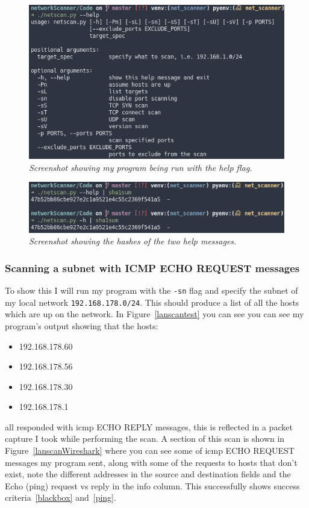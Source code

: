 \documentclass[titlepage]{article}
\let\Oldsubsubsection\subsubsection{}
\renewcommand{\subsubsection}{\FloatBarrier\Oldsubsubsection}
\begin{document}
\begin{figure}[H]
  \centering
  \includegraphics[width=\textwidth]{helpmessage.png}
  \caption{\textit{%
    Screenshot showing my program being run with the help flag.
}}\label{helpflagtest}
\end{figure}

\begin{figure}[H]
  \centering
  \includegraphics[width=\textwidth]{messagehashes.png}
  \caption{\textit{%
    Screenshot showing the hashes of the two help messages.
}}\label{messagehash}
\end{figure}

\subsubsection{Scanning a subnet with ICMP ECHO REQUEST messages}
To show this I will run my program with the \verb|-sn| flag and specify the
subnet of my local network \verb|192.168.178.0/24|.
This should produce a list of all the hosts which are up on the network.
In Figure~\ref{lanscantest} you can see you can see my program's output
showing that the hosts:
\begin{itemize}
  \item{192.168.178.60}
  \item{192.168.178.56}
  \item{192.168.178.30}
  \item{192.168.178.1}
\end{itemize}
all responded with \gls{icmp} ECHO REPLY messages, this is reflected
in a packet capture I took while performing the scan. A section of this
scan is shown in Figure~\ref{lanscanWireshark} where you can see some of
\gls{icmp} ECHO REQUEST messages my program sent, along with some of the requests
to hosts that don't exist, note the different addresses in the source and destination fields
and the Echo (ping) request vs reply in the info column. This successfully shows success
criteria~\ref{blackbox} and~\ref{ping}.
\end{document}
